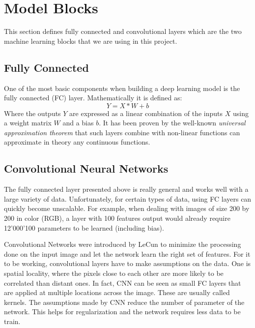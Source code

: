 \section{Model Blocks}
This section defines fully connected and convolutional layers which are the two machine learning blocks that we are using in this project.
\subsection{Fully Connected}

One of the most basic components when building a deep learning model is the fully connected (FC) layer. Mathematically it is defined as:
$$Y=X*W + b$$
Where the outputs $Y$ are expressed as a linear combination of the inputs $X$ using a weight matrix $W$ and a bias $b$. It has been proven by the well-known \textit{universal approximation theorem}\cite{universal_approx_theorem_10.5555/70405.70408} that such layers combine with non-linear functions can approximate in theory any continuous functions.

\subsection{Convolutional Neural Networks}

The fully connected layer presented above is really general and works well with a large variety of data. Unfortunately, for certain types of data, using FC layers can quickly become unscalable. For example, when dealing with images of size 200 by 200 in color (RGB), a layer with 100 features output would already require 12'000'100 parameters to be learned (including bias). 

Convolutional Networks\cite{cnn_original_paper_10.5555/646469.691875} were introduced by LeCun to minimize the processing done on the input image and let the network learn the right set of features. For it to be working, convolutional layers have to make assumptions on the data. One is spatial locality, where the pixels close to each other are more likely to be correlated than distant ones. In fact, CNN can be seen as small FC layers that are applied at multiple locations across the image. These are usually called kernels. The assumptions made by CNN reduce the number of parameter of the network. This helps for regularization and the network requires less data to be train.


